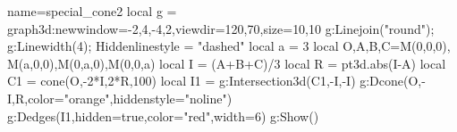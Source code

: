 \documentclass[12pt]{standalone}
\begin{document}
\begin{luadraw}{name=special_cone2}
local g = graph3d:new{window={-2,4,-4,2},viewdir={120,70},size={10,10}}
g:Linejoin("round"); g:Linewidth(4); Hiddenlinestyle = "dashed"
local a = 3
local O,A,B,C=M(0,0,0), M(a,0,0),M(0,a,0),M(0,0,a)
local I = (A+B+C)/3
local R = pt3d.abs(I-A)
local C1 = cone(O,-2*I,2*R,100)
local I1 = g:Intersection3d(C1,{-I,-I})
g:Dcone(O,-I,R,{color="orange",hiddenstyle="noline"}) 
g:Dedges(I1,{hidden=true,color="red",width=6})
g:Show()
\end{luadraw}
\end{document}
